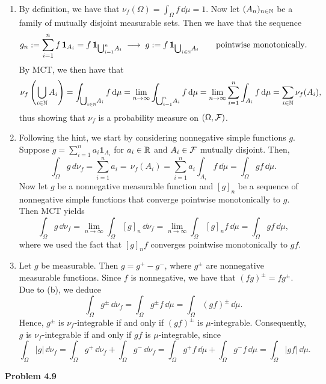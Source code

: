 \begin{enumerate}[label={(\alph*)}]
	\item By definition, we have that $\nu_f(\Omega) = \int_\Omega f\,\dd\mu = 1$. Now let $(A_n)_{n\in\mathbb N}$ be a family of mutually disjoint measurable sets. Then we have that the sequence 
	\[
		g_n:= \sum_{i=1}^n f\,\mathbf{1}_{A_i} = f\,\mathbf{1}_{\bigcup_{i=1}^n\! A_i}\;\longrightarrow\; g:= f\,\mathbf{1}_{\bigcup_{i\in\mathbb N}\! A_i}\qquad\text{pointwise monotonically}.
	\]
	By MCT, we then have that
	\[
		\nu_f\left(\bigcup_{i\in\mathbb N} A_i\right) = \int_{\bigcup_{i\in\mathbb N}\! A_i} f\,\mathrm{d}\mu = \lim_{n\to\infty} \int_{\bigcup_{i=1}^n\! A_i} f\,\mathrm{d}\mu = \lim_{n\to\infty} \sum_{i=1}^n \int_{A_i} f\,\mathrm{d}\mu = \sum_{i\in\mathbb N}\nu_f(A_i),
	\]
	thus showing that $\nu_f$ is a probability measure on $(\Omega,\mathcal F)$.
	
	\item Following the hint, we start by considering nonnegative simple functions $g$. Suppose $g=\sum_{i=1}^n a_i \mathbf{1}_{A_i}$ for $a_i\in\mathbb R$ and $A_i\in\mathcal F$ mutually disjoint. Then,
	\[
		\int_\Omega g\,d\nu_f = \sum_{i=1}^n a_i =\,\nu_f(A_i) = \sum_{i=1}^n a_i\int_{A_i} f\,\dd\mu = \int_\Omega gf\,\dd\mu.
	\]
	Now let $g$ be a nonnegative measurable function and $[g]_n$ be a sequence of nonnegative simple functions that converge pointwise monotonically to $g$. Then MCT yields
	\[
		\int_\Omega g\,\dd\nu_f = \lim_{n\to\infty}\int_\Omega [g]_n\,\dd\nu_f = \lim_{n\to\infty} \int_\Omega [g]_n f\,\dd\mu = \int_\Omega gf\,\dd\mu,
	\]
	where we used the fact that $[g]_n f$ converges pointwise monotonically to $gf$.
	
	\item Let $g$ be measurable. Then $g=g^+-g^-$, where $g^\pm$ are nonnegative measurable functions. Since $f$ is nonnegative, we have that $(fg)^\pm = f g^\pm$. Due to (b), we deduce
	\[
		\int_\Omega g^\pm\,\dd\nu_f = \int_\Omega g^\pm f\,\dd\mu = \int_\Omega (gf)^\pm\,\dd\mu.
	\]
	Hence, $g^\pm$ is $\nu_f$-integrable if and only if $(gf)^\pm$ is $\mu$-integrable. Consequently, $g$ is $\nu_f$-integrable if and only if $gf$ is $\mu$-integrable, since
	\[
		\int_\Omega |g|\,\dd\nu_f = \int_\Omega g^+\,\dd\nu_f + \int_\Omega g^-\,\dd\nu_f = \int_\Omega g^+f\,\dd\mu + \int_\Omega g^-f\,\dd\mu = \int_\Omega |gf|\,\dd\mu.
	\]
\end{enumerate}

\bigskip
\textbf{Problem 4.9}

